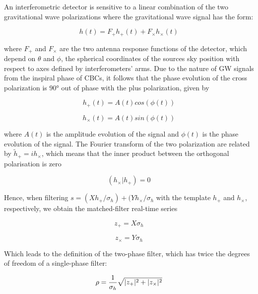 \documentclass[binding=0.6cm, LaM]{sapthesis}
\begin{document}
	An interferometric detector is sensitive to a linear combination 
	of the two gravitational wave polarizations where the gravitational wave signal has the form: 

                \begin{equation}
                h(t) = F_{+}h_{+} (t) + F_{\times}h_{\times}(t)
                \end{equation}

	where $F_{+}$ and $F_{\times}$ are the two antenna response functions of the detector, 
	which depend on $\theta$ and $\phi$, 
	the spherical coordinates of the sources sky position with respect to axes defined by interferometers’ arms. 
	Due to the nature of GW signals from the inspiral phase of CBCs, 
	it follows that the phase evolution of the cross polarization is $\ang{90}$ out of phase with the plus polarization, given by 

		\begin{equation}
			h_{+}(t) = A(t) cos (\phi (t))
		\end{equation}

		\begin{equation}
			h_{\times}(t) = A(t) sin (\phi (t))  
		\end{equation}
	
	where $A(t)$ is the amplitude evolution of the signal 
	and $\phi(t)$ is the phase evolution of the signal. 
	The Fourier transform of the two polarization are related by $\tilde h_{+} = ih_{\times}$, 
	which means that the inner product between the orthogonal polarisation is zero 

		\begin{equation}
			(h_{\times}|h_{+}) = 0
		\end{equation}
 
	Hence, when filtering  $s = (Xh_{+}/\sigma_{h}) + (Y h_{\times}/\sigma_{h}$ 
	with the template $h_{+}$ and $h_{\times}$, 
	respectively, we obtain the matched-filter real-time series
 
		\begin{equation}
			z_{+} = X\sigma_{h}
		\end{equation}

		\begin{equation}
			z_{\times} = Y \sigma_{h} 
		\end{equation}

	Which leads to the definition of the two-phase filter, 
	which has twice the degrees of freedom of a single-phase filter:

		\begin{equation}
			\rho = {1 \over \sigma_h} \sqrt{|z_{+}| ^2+ |z_{\times}|^2}
		\end{equation}
\end{document}
